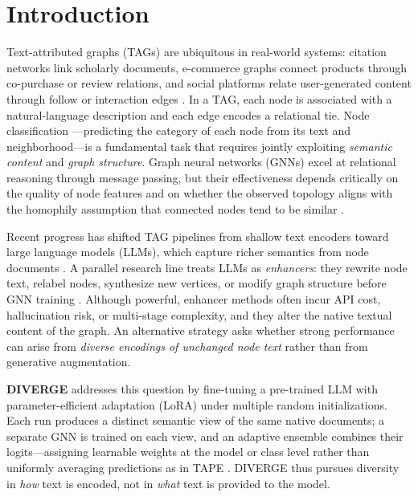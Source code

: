 \documentclass{article}
\begin{document}
\section{Introduction}
\label{sec:introduction}

Text-attributed graphs (TAGs) are ubiquitous in real-world systems: citation networks
link scholarly documents, e-commerce graphs connect products through co-purchase or
review relations, and social platforms relate user-generated content through follow or
interaction edges \citep{Zhang2024TAGSurvey}. In a TAG, each node is associated with a
natural-language description and each edge encodes a relational tie. Node classification
---predicting the category of each node from its text and neighborhood---is a fundamental
task that requires jointly exploiting \emph{semantic content} and \emph{graph structure}.
Graph neural networks (GNNs) excel at relational reasoning through message passing, but
their effectiveness depends critically on the quality of node features and on whether
the observed topology aligns with the homophily assumption that connected nodes tend to
be similar \citep{Kipf2016GCN,Velickovic2018GAT,jin2020prognn}.

Recent progress has shifted TAG pipelines from shallow text encoders toward large
language models (LLMs), which capture richer semantics from node documents
\citep{Chen2024LLaGA,Huang2024GNNAdapters,he2024harnessing}. A parallel research line
treats LLMs as \emph{enhancers}: they rewrite node text, relabel nodes, synthesize new
vertices, or modify graph structure before GNN training \citep{he2024harnessing,
Sun2026TopologicalEnhancerTAG,zhang2025leveraging,Yu2025NodeGenerationTAG}. Although
powerful, enhancer methods often incur API cost, hallucination risk, or multi-stage
complexity, and they alter the native textual content of the graph. An alternative
strategy asks whether strong performance can arise from \emph{diverse encodings of
unchanged node text} rather than from generative augmentation.

\textbf{DIVERGE} addresses this question by fine-tuning a pre-trained LLM with
parameter-efficient adaptation (LoRA) under multiple random initializations. Each run
produces a distinct semantic view of the same native documents; a separate GNN is
trained on each view, and an adaptive ensemble combines their logits---assigning
learnable weights at the model or class level rather than uniformly averaging predictions
as in TAPE \citep{he2024harnessing}. DIVERGE thus pursues diversity in \emph{how} text
is encoded, not in \emph{what} text is provided to the model.
\end{document}
